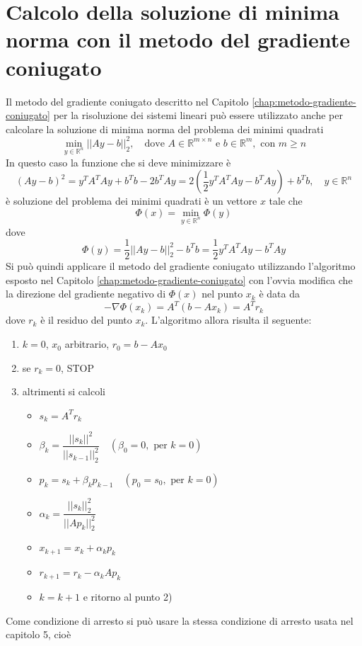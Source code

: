 \section{Calcolo della soluzione di minima norma con il
metodo del gradiente coniugato}
Il metodo del gradiente coniugato descritto nel Capitolo \ref{chap:metodo-gradiente-coniugato}
 per la risoluzione dei sistemi lineari pu\`o essere utilizzato 
anche per calcolare la soluzione 
di minima norma del problema dei minimi quadrati
$$
\displaystyle \min_{y \in \mathbb{R}^{n}}
||Ay - b||_2^{2}, \quad \text{dove } A \in
\mathbb{R}^{m \times n} \text{ e } b \in \mathbb{R}^{m}, \text{ con }
m \geq n 
$$
In questo caso la funzione che si deve minimizzare \`e
$$
(Ay - b)^2 = y^T A^T Ay + b^Tb -2b^TAy = 2(\frac{1}{2}
y^{T}A^{T}A y - b^TAy) + b^Tb, \quad y \in \mathbb{R}^n 
$$
\`e soluzione del problema dei minimi quadrati \`e un vettore $x$ tale che
$$
\Phi(x) = \min_{y \in \mathbb{R}^{n}} \Phi(y)
$$
dove
$$
\Phi(y) = \frac{1}{2}||Ay-b||_2^2 - b^Tb = 
\frac{1}{2}y^TA^TAy - b^TAy
$$
Si pu\`o quindi applicare il metodo del gradiente coniugato
 utilizzando l'algoritmo esposto nel Capitolo \ref{chap:metodo-gradiente-coniugato} con
 l'ovvia modifica che la direzione del gradiente negativo di
$\Phi(x)$   nel punto $x_k$ \`e  data da
$$
-\nabla \Phi(x_k) = A^T(b-Ax_k)=A^Tr_k
$$
dove $r_k$ \`e il residuo del punto $x_k$. L'algoritmo allora risulta
il seguente:
\begin{enumerate}
\item $k=0$, $x_0$ arbitrario, $r_0 = b - Ax_0$
\item se $r_k=0$, STOP
\item altrimenti si calcoli
  \begin{itemize}
  \item $s_k = A^Tr_k$
  \item $\beta_k = \dfrac{||s_k||^2}{||s_{k-1}||_2^2} \quad
(\beta_0 = 0, \text{ per } k=0)$
\item $p_k = s_k + \beta_k p_{k-1} \quad (p_0 = s_0, \text{ per } k=0)$
\item $\alpha_k = \dfrac{||s_k||_2^2}{||Ap_k||_2^2} $
 \item $x_{k+1} = x_k + \alpha_k p_k$
\item $r_{k+1} = r_k - \alpha_k Ap_k$
\item $k = k+1$ e ritorno al punto 2)
  \end{itemize}
\end{enumerate}

Come condizione di arresto si pu\`o usare la stessa condizione di
 arresto usata nel capitolo 5, cio\`e

